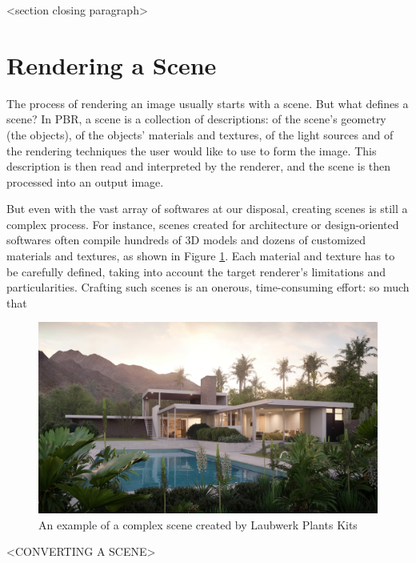 \documentclass[cic,tc,english]{iiufrgs}
\begin{document}
<section closing paragraph>

\section{Rendering a Scene}
The process of rendering an image usually starts with a scene. But what defines 
a scene? In PBR, a scene is a collection of descriptions: of the scene's 
geometry (the objects), of the objects' materials and textures, of the light 
sources and of the rendering techniques the user would like to use to form the 
image. This description is then read and interpreted by the renderer, and the 
scene is then processed into an output image.

But even with the vast array of softwares at our disposal, creating scenes is 
still a complex process. For instance, scenes created for architecture or 
design-oriented softwares often compile hundreds of 3D models and dozens of 
customized materials and textures, as shown in Figure 
\ref{fig:intro_complexScene}. Each material and texture has to be carefully 
defined, taking into account the target 
renderer's limitations and particularities. Crafting such scenes is an onerous, 
time-consuming effort: so much that 

\begin{figure}[h]
  
\includegraphics[width=\textwidth,height=\textheight,keepaspectratio]{../images/1_introduction/Laubwerk-Kit-12_Bauclassroom-Exterior}
  \caption{An example of a complex scene created by Laubwerk Plants Kits}
  \label{fig:intro_complexScene}
\end{figure}

<CONVERTING A SCENE>
\end{document}
